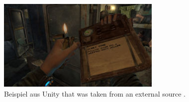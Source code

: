 		\begin{figure}[htbp]
			\centering
			\includegraphics[width=0.7\textwidth]{figures/diegeticUI.jpeg}
			\caption{Beispiel aus Unity that was taken from an external source .}
			\label{fig:diegetic}
		\end{figure}
	
